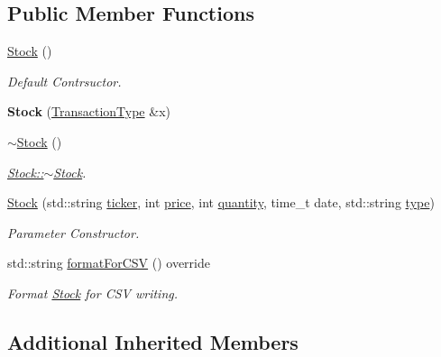 \subsection*{Public Member Functions}
\begin{DoxyCompactItemize}
\item 
\mbox{\hyperlink{class_stock_adddc4282213b3174a4299cca5a30117c}{Stock}} ()
\begin{DoxyCompactList}\small\item\em Default Contrsuctor. \end{DoxyCompactList}\item 
\mbox{\label{class_stock_a855ce07aef7d8b4a7d6bffb301a10e53}} 
{\bfseries Stock} (\mbox{\hyperlink{class_transaction_type}{Transaction\+Type}} \&x)
\item 
\mbox{\label{class_stock_a29cb9e4fc7c907ef975d7ea90ef55e24}} 
\mbox{\hyperlink{class_stock_a29cb9e4fc7c907ef975d7ea90ef55e24}{$\sim$\+Stock}} ()
\begin{DoxyCompactList}\small\item\em \mbox{\hyperlink{class_stock_a29cb9e4fc7c907ef975d7ea90ef55e24}{Stock\+::$\sim$\+Stock}}. \end{DoxyCompactList}\item 
\mbox{\hyperlink{class_stock_a91ae0fdc8b4b70446d328dbec96f043d}{Stock}} (std\+::string \mbox{\hyperlink{class_transaction_type_aad758d557417a18c944dc9849a390391}{ticker}}, int \mbox{\hyperlink{class_transaction_type_a079b40eebde548904529841f8746d4ff}{price}}, int \mbox{\hyperlink{class_transaction_type_a60b6221cf4b0bf30f5c4a4e15893b98d}{quantity}}, time\+\_\+t date, std\+::string \mbox{\hyperlink{class_transaction_type_a8052c2576840eba8072c008022f38d51}{type}})
\begin{DoxyCompactList}\small\item\em Parameter Constructor. \end{DoxyCompactList}\item 
std\+::string \mbox{\hyperlink{class_stock_a32283ba4a8ff5a187a51ff8a1b83b8cc}{format\+For\+C\+SV}} () override
\begin{DoxyCompactList}\small\item\em Format \mbox{\hyperlink{class_stock}{Stock}} for C\+SV writing. \end{DoxyCompactList}\end{DoxyCompactItemize}
\subsection*{Additional Inherited Members}


